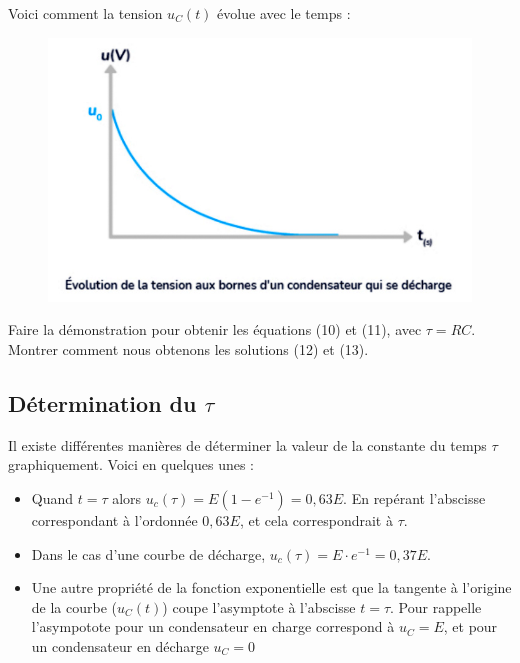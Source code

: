 \documentclass[11pt,a4paper]{article}
\begin{document}
Voici comment la tension $u_C(t)$ évolue avec le temps : 

\begin{figure}[H]
    \centering
    \includegraphics[width=0.7\linewidth]{imgs/p7/courbeDecharge.png.jpg}
\end{figure}

\begin{exo}
Faire la démonstration pour obtenir les équations (10) et (11), avec $\tau = RC$. Montrer comment nous obtenons les solutions (12) et (13). 
\vspace{10cm}
\end{exo}

\subsection{Détermination du $\tau$}

Il existe différentes manières de déterminer la valeur de la constante du temps $\tau$ graphiquement. Voici en quelques unes : 
\begin{itemize}
    \item Quand $t=\tau$ alors $u_c(\tau) = E\left(1-e^{-1}\right) = 0,63E$. En repérant l'abscisse correspondant à l'ordonnée $0,63E$, et cela correspondrait à $\tau$. 
    \item Dans le cas d'une courbe de décharge, $u_c(\tau) = E\cdot e^{-1} = 0,37E$.
    \item Une autre propriété de la fonction exponentielle est que la tangente à l'origine de la courbe ($u_C(t)$) coupe l'asymptote à l'abscisse $t=\tau$. Pour rappelle l'asympotote pour un condensateur en charge correspond à $u_C = E$, et pour un condensateur en décharge $u_C = 0$
\end{itemize}
\end{document}

